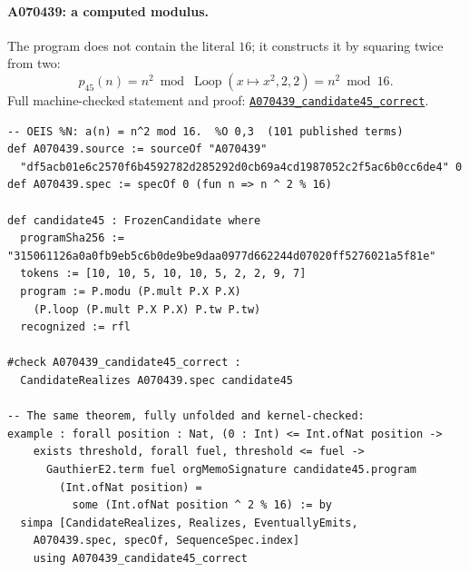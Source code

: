 \documentclass[11pt]{article}
\newcommand{\formalcommit}{f3a31db36bb2f944312ee31c1d86c2758109e83a}
\newcommand{\formalblob}{https://github.com/zariuq/MeTTapedia/blob/\formalcommit/lean/mettapedia/Mettapedia}
\newcommand{\leansource}[3]{%
  \href{\formalblob/#1\#L#2}{\nolinkurl{#3}}}
\begin{document}
\paragraph{A070439: a computed modulus.}
The program does not contain the literal $16$; it constructs it by squaring twice from two:
\[
 p_{45}(n)=n^2\bmod\operatorname{Loop}(x\mapsto x^2,2,2)
          =n^2\bmod16.
\]
\noindent Full machine-checked statement and proof:
\leansource{GSLT/LanguageDef/Gauthier/Adjudications33.lean}{175-L195}{A070439_candidate45_correct}.
\begin{lstlisting}[caption={A070439, discovered exclusively by the recurrent-vector arm
in world 1, generation 5. The synthesized denominator computes 16 rather than storing it.}]
-- OEIS %N: a(n) = n^2 mod 16.  %O 0,3  (101 published terms)
def A070439.source := sourceOf "A070439"
  "df5acb01e6c2570f6b4592782d285292d0cb69a4cd1987052c2f5ac6b0cc6de4" 0
def A070439.spec := specOf 0 (fun n => n ^ 2 % 16)

def candidate45 : FrozenCandidate where
  programSha256 := "315061126a0a0fb9eb5c6b0de9be9daa0977d662244d07020ff5276021a5f81e"
  tokens := [10, 10, 5, 10, 10, 5, 2, 2, 9, 7]
  program := P.modu (P.mult P.X P.X)
    (P.loop (P.mult P.X P.X) P.tw P.tw)
  recognized := rfl

#check A070439_candidate45_correct :
  CandidateRealizes A070439.spec candidate45

-- The same theorem, fully unfolded and kernel-checked:
example : forall position : Nat, (0 : Int) <= Int.ofNat position ->
    exists threshold, forall fuel, threshold <= fuel ->
      GauthierE2.term fuel orgMemoSignature candidate45.program
        (Int.ofNat position) =
          some (Int.ofNat position ^ 2 % 16) := by
  simpa [CandidateRealizes, Realizes, EventuallyEmits,
    A070439.spec, specOf, SequenceSpec.index]
    using A070439_candidate45_correct
\end{lstlisting}

\end{document}
